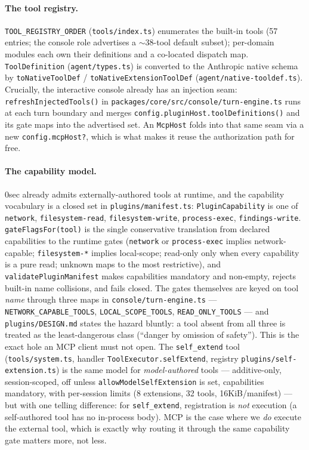 \documentclass[11pt]{article}
\begin{document}
\paragraph{The tool registry.} \texttt{TOOL\_REGISTRY\_ORDER}
(\texttt{tools/index.ts}) enumerates the built-in tools (57 entries; the console
role advertises a $\sim$38-tool default subset); per-domain modules each own
their definitions and a co-located dispatch map. \texttt{ToolDefinition}
(\texttt{agent/types.ts}) is converted to the Anthropic native schema by
\texttt{toNativeToolDef} / \texttt{toNativeExtensionToolDef}
(\texttt{agent/native-tooldef.ts}). Crucially, the interactive console already
has an injection seam: \texttt{refreshInjectedTools()} in
\texttt{packages/core/src/console/turn-engine.ts} runs at each turn boundary and
merges \texttt{config.pluginHost.toolDefinitions()} and its gate maps into the
advertised set. An \texttt{McpHost} folds into that same seam via a new
\texttt{config.mcpHost?}, which is what makes it reuse the authorization path for
free.

\paragraph{The capability model.} 0sec already admits externally-authored tools
at runtime, and the capability vocabulary is a closed set in
\texttt{plugins/manifest.ts}: \texttt{PluginCapability} is one of
\texttt{network}, \texttt{filesystem-read}, \texttt{filesystem-write},
\texttt{process-exec}, \texttt{findings-write}. \texttt{gateFlagsFor(tool)} is the
single conservative translation from declared capabilities to the runtime gates
(\texttt{network} or \texttt{process-exec} implies network-capable;
\texttt{filesystem-*} implies local-scope; read-only only when every capability
is a pure read; unknown maps to the most restrictive), and
\texttt{validatePluginManifest} makes capabilities mandatory and non-empty,
rejects built-in name collisions, and fails closed. The gates themselves are
keyed on tool \emph{name} through three maps in
\texttt{console/turn-engine.ts} --- \texttt{NETWORK\_CAPABLE\_TOOLS},
\texttt{LOCAL\_SCOPE\_TOOLS}, \texttt{READ\_ONLY\_TOOLS} --- and
\texttt{plugins/DESIGN.md} states the hazard bluntly: a tool absent from all
three is treated as the least-dangerous class (``danger by omission of
safety''). This is the exact hole an MCP client must not open. The
\texttt{self\_extend} tool (\texttt{tools/system.ts}, handler
\texttt{ToolExecutor.selfExtend}, registry \texttt{plugins/self-extension.ts}) is
the same model for \emph{model-authored} tools --- additive-only, session-scoped,
off unless \texttt{allowModelSelfExtension} is set, capabilities mandatory, with
per-session limits (8 extensions, 32 tools, 16KiB/manifest) --- but with one
telling difference: for \texttt{self\_extend}, registration is \emph{not}
execution (a self-authored tool has no in-process body). MCP is the case where we
\emph{do} execute the external tool, which is exactly why routing it through the
same capability gate matters more, not less.
\end{document}

